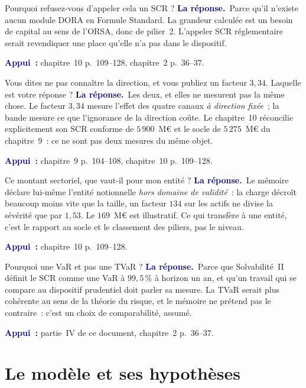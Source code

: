 \documentclass[11pt,a4paper]{article}
\newcommand{\rep}[1]{\smallskip\noindent\textcolor{navy}{\textbf{La réponse.}}\ #1\par}
\newcommand{\appui}[1]{\smallskip\noindent\small\textcolor{navy}{\textbf{Appui~:}} #1\par\normalsize}
\begin{document}
\begin{question}{\og Pourquoi refusez-vous d'appeler cela un SCR ?\fg{}}
\rep{Parce qu'il n'existe aucun module DORA en Formule Standard. La grandeur calculée est un
besoin de capital au sens de l'ORSA, donc de pilier~2. L'appeler SCR réglementaire serait
revendiquer une place qu'elle n'a pas dans le dispositif.}
\appui{chapitre~10 p.~109--128, chapitre~2 p.~36--37.}
\end{question}

\begin{question}{\og Vous dites ne pas connaître la direction, et vous publiez un facteur $3{,}34$. Laquelle est votre réponse ?\fg{}}
\rep{Les deux, et elles ne mesurent pas la même chose. Le facteur $3{,}34$ mesure l'effet des
quatre canaux \emph{à direction fixée}~; la bande mesure ce que l'ignorance de la direction
coûte. Le chapitre~10 réconcilie explicitement son SCR conforme de $5\,900$~M\euro{} et le socle
de $5\,275$~M\euro{} du chapitre~9~: ce ne sont pas deux mesures du même objet.}
\appui{chapitre~9 p.~104--108, chapitre~10 p.~109--128.}
\end{question}

\begin{question}{\og Ce montant sectoriel, que vaut-il pour mon entité ?\fg{}}
\rep{Le mémoire déclare lui-même l'entité notionnelle \emph{hors domaine de validité}~: la
charge décroît beaucoup moins vite que la taille, un facteur $134$ sur les actifs ne divise la
sévérité que par $1{,}53$. Le $169$~M\euro{} est illustratif. Ce qui transfère à une entité,
c'est le rapport au socle et le classement des piliers, pas le niveau.}
\appui{chapitre~10 p.~109--128.}
\end{question}

\begin{question}{\og Pourquoi une VaR et pas une TVaR ?\fg{}}
\rep{Parce que Solvabilité~II définit le SCR comme une VaR à $99{,}5\,\%$ à horizon un an, et
qu'un travail qui se compare au dispositif prudentiel doit parler sa mesure. La TVaR serait plus
cohérente au sens de la théorie du risque, et le mémoire ne prétend pas le contraire~: c'est un
choix de comparabilité, assumé.}
\appui{partie~IV de ce document, chapitre~2 p.~36--37.}
\end{question}

\section{Le modèle et ses hypothèses}
\end{document}
